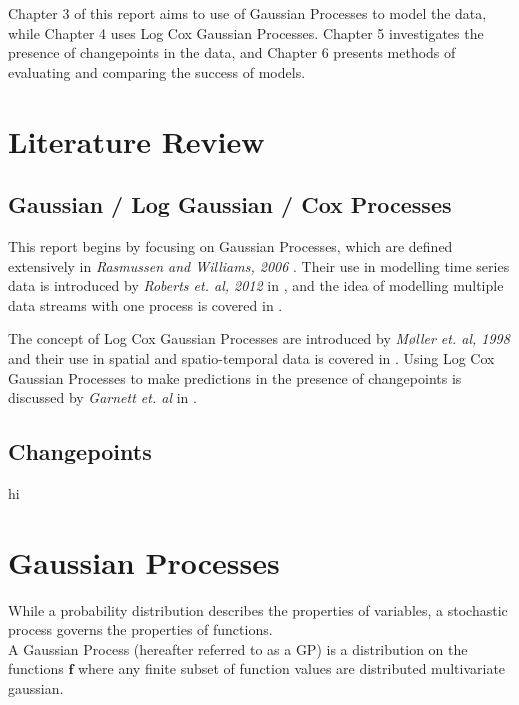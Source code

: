 \documentclass[a4paper,11pt]{report}
\begin{document}
Chapter 3 of this report aims to use of Gaussian Processes to model the data, while Chapter 4 uses Log Cox Gaussian Processes. Chapter 5 investigates the presence of changepoints in the data, and Chapter 6 presents methods of evaluating and comparing the success of models. 

\chapter{Literature Review}

\section{Gaussian / Log Gaussian / Cox Processes}
This report begins by focusing on Gaussian Processes, which are defined extensively in \textit{Rasmussen and Williams, 2006} \cite{GP4ML}. Their use in modelling time series data is introduced by \textit{Roberts et. al, 2012} in \cite{GP-robots}, and the idea of modelling multiple data streams with one process is covered in \cite{multi-outputGP}.

The concept of Log Cox Gaussian Processes are introduced by \textit{M\o ller et. al, 1998} \cite{LGCP-moller} and their use in spatial and spatio-temporal data is covered in \cite{LGCP-diggle}. Using Log Cox Gaussian Processes to make predictions in the presence of changepoints is discussed by \textit{Garnett et. al} in \cite{changepoint-prediction}.

\section{Changepoints}
hi

\chapter{Gaussian Processes}

While a probability distribution describes the properties of variables, a stochastic process governs the properties of functions. \\

A Gaussian Process (hereafter referred to as a GP) is a distribution on the functions \(\mathbf{f}\) where any finite subset of function values are distributed multivariate gaussian. 
\end{document}
